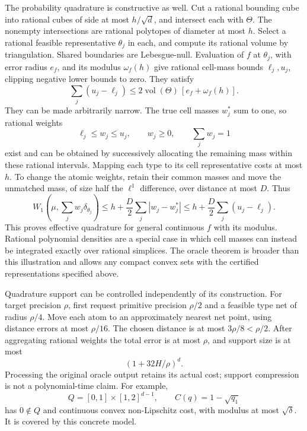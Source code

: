 \documentclass[11pt,a4paper]{article}
\numberwithin{equation}{section}
\DeclareMathOperator{\vol}{vol}
\begin{document}
The probability quadrature is constructive as well.
Cut a rational bounding cube into rational cubes of side at most
\(h/\sqrt d\), and intersect each with \(\Theta\).
The nonempty intersections are rational polytopes of diameter at most
\(h\). Select a rational feasible representative \(\theta_j\) in each,
and compute its rational volume by triangulation.
Shared boundaries are Lebesgue-null.
Evaluation of \(f\) at \(\theta_j\), with error radius \(e_f\), and
its modulus \(\omega_f(h)\) give rational cell-mass bounds
\(\ell_j,u_j\), clipping negative lower bounds to zero. They satisfy
\[
 \sum_j(u_j-\ell_j)
 \le2\vol(\Theta)\,[e_f+\omega_f(h)].
\]
They can be made arbitrarily narrow.
The true cell masses \(w_j^*\) sum to one, so rational weights
\[
 \ell_j\le w_j\le u_j,\qquad w_j\ge0,\qquad\sum_jw_j=1
\]
exist and can be obtained by successively allocating the remaining
mass within these rational intervals.
Mapping each type to its cell representative costs at most \(h\).
To change the atomic weights, retain their common masses and move
the unmatched mass, of size half the \(\ell^1\) difference, over
distance at most \(D\). Thus
\[
 W_1\left(\mu,\sum_jw_j\delta_{\theta_j}\right)
 \le h+\frac D2\sum_j|w_j-w_j^*|
 \le h+\frac D2\sum_j(u_j-\ell_j).
\]
This proves effective quadrature for general continuous \(f\) with
its modulus. Rational polynomial densities are a special case in which
cell masses can instead be integrated exactly over rational simplices.
The oracle theorem is broader than this illustration and allows any
compact convex sets with the certified representations specified above.

Quadrature support can be controlled independently of its construction.
For target precision \(\rho\), first request primitive precision
\(\rho/2\) and a feasible type net of radius \(\rho/4\).
Move each atom to an approximately nearest net point, using distance
errors at most \(\rho/16\).
The chosen distance is at most \(3\rho/8<\rho/2\).
After aggregating rational weights the total error is at most \(\rho\),
and support size is at most
\[
 (1+32H/\rho)^d.
\]
Processing the original oracle output retains its actual cost;
support compression is not a polynomial-time claim.
For example,
\[
 Q=[0,1]\times[1,2]^{d-1},\qquad C(q)=1-\sqrt{q_1}
\]
has \(0\notin Q\) and continuous convex non-Lipschitz cost, with
modulus at most \(\sqrt\delta\). It is covered by this concrete model.
\end{document}
